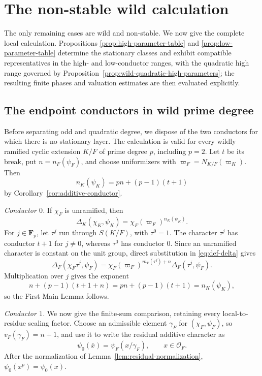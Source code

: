 \documentclass[11pt]{amsart}
\theoremstyle{definition}
\theoremstyle{remark}
\newcommand{\F}{\mathbf F}
\newcommand{\cO}{\mathcal O}
\begin{document}
\section{The non-stable wild calculation}

The only remaining cases are wild and non-stable.  We now give the
complete local calculation.  Propositions
\ref{prop:high-parameter-table} and \ref{prop:low-parameter-table}
determine the stationary classes and exhibit compatible representatives
in the high- and low-conductor ranges, with the quadratic high range
governed by
Proposition~\ref{prop:wild-quadratic-high-parameters}; the resulting finite phases and valuation estimates are
then evaluated explicitly.

\subsection{The endpoint conductors in wild prime degree}\label{sec:wild-endpoints}
Before separating odd and quadratic degree, we dispose of the two
conductors for which there is no stationary layer.  The calculation is
valid for every wildly ramified cyclic extension $K/F$ of prime degree
$p$, including $p=2$.  Let $t$ be its break, put
$n=n_F(\psi_F)$, and choose uniformizers with
$\varpi_F=N_{K/F}(\varpi_K)$.  Then
\begin{equation}\label{eq:endpoint-additive-conductor}
 n_K(\psi_K)=pn+(p-1)(t+1)
\end{equation}
by Corollary~\ref{cor:additive-conductor}.

\medskip
\noindent\emph{Conductor $0$.}
If $\chi_F$ is unramified, then
\[
 \Delta_K(\chi_K,\psi_K)
 =\chi_F(\varpi_F)^{n_K(\psi_K)}.
\]
For $j\in\F_p$, let $\tau^j$ run through $S(K/F)$, with
$\tau^0=1$.  The character $\tau^j$ has conductor $t+1$ for
$j\ne0$, whereas $\tau^0$ has conductor $0$.  Since an unramified
character is constant on the unit group, direct substitution in
\eqref{eq:def-delta} gives
\[
 \Delta_F(\chi_F\tau^j,\psi_F)
 =\chi_F(\varpi_F)^{m_F(\tau^j)+n}
  \Delta_F(\tau^j,\psi_F).
\]
Multiplication over $j$ gives the exponent
\[
 n+(p-1)(t+1+n)=pn+(p-1)(t+1)=n_K(\psi_K),
\]
so the First Main Lemma follows.

\medskip
\noindent\emph{Conductor $1$.}
We now give the finite-sum comparison, retaining every local-to-residue
scaling factor.
Choose an admissible element $\gamma_F$ for $(\chi_F,\psi_F)$, so
$v_F(\gamma_F)=n+1$, and use it to write the residual additive
character as
\[
 \psi_0(\bar x)=\psi_F(x/\gamma_F),\qquad x\in\cO_F.
\]
After the normalization of Lemma~\ref{lem:residual-normalization},
$\psi_0(x^p)=\psi_0(x)$.
\end{document}
